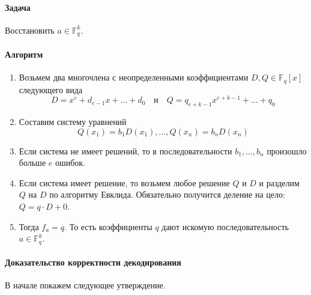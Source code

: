\paragraph{Задача}

Восстановить $a\in \mathbb F_q^k$.

\paragraph{Алгоритм}

\begin{enumerate}
\item Возьмем два многочлена с неопределенными коэффициентами $D, Q\in \mathbb F_q[x]$ следующего вида
\[
D = x^e + d_{e-1}x + \ldots + d_0\quad\text{и}\quad
Q = q_{e+k - 1}x^{e+k-1} + \ldots + q_0
\]

\item Составим систему уравнений
\[
Q(x_1) = b_1 D(x_1),\ldots,Q(x_n) = b_n D(x_n)
\]

\item Если система не имеет решений, то в последовательности $b_1,\ldots, b_n$ произошло больше $e$ ошибок.

\item Если система имеет решение, то возьмем любое решение $Q$ и $D$ и разделим $Q$ на $D$ по алгоритму Евклида.
Обязательно получится деление на цело: $Q = q \cdot D + 0$.

\item Тогда $f_a = q$.
То есть коэффициенты $q$ дают искомую последовательность $a \in \mathbb F_q^k$.
\end{enumerate}

\paragraph{Доказательство корректности декодирования}

В начале покажем следующее утверждение.

